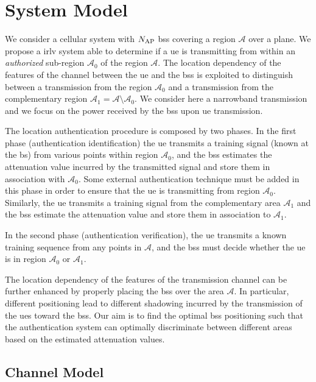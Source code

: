 \documentclass[twocolumns]{IEEEtran}
\begin{document}
\section{System Model}\label{sec:sys model}


We consider a cellular system with $N_{\rm AP}$ \acp{bs} covering a region $\mathcal{A}$ over a plane. We propose a \ac{irlv} system able to determine if a \ac{ue} is transmitting from within an {\em authorized} sub-region $\mathcal{A}_0$ of the region $\mathcal{A}$. The location dependency of the features of the channel between the \ac{ue} and the \acp{bs} is exploited to distinguish between a transmission from the region $\mathcal{A}_0$ and a transmission from the complementary region $\mathcal{A}_1=\mathcal{A} \setminus \mathcal{A}_0$. We consider here a narrowband transmission and we focus on the power received by the \acp{bs} upon \ac{ue} transmission.

The location authentication procedure is composed by two phases. In the first phase (authentication identification) the \ac{ue} transmits a training signal (known at the \acs{bs}) from various points within region $\mathcal{A}_0$, and the \acp{bs} estimates the attenuation value incurred by the transmitted signal and store them in association with $\mathcal{A}_0$. Some external authentication technique must be added in this phase in order to ensure that the \ac{ue} is transmitting from region $\mathcal{A}_0$. Similarly, the \ac{ue} transmits a training signal from the complementary area $\mathcal{A}_1$ and the \acp{bs} estimate the attenuation value and store them in association to $\mathcal{A}_1$.

In the second phase (authentication verification), the \ac{ue} transmits a known training sequence from any points in $\mathcal{A}$, and the \acp{bs} must decide whether the \ac{ue} is in region $\mathcal{A}_0$ or $\mathcal{A}_1$.

The location dependency of the features of the transmission channel can be further enhanced by properly placing the \acp{bs} over the area $\mathcal{A}$. In particular, different positioning lead to different shadowing incurred by the transmission of the \acp{ue} toward the \acp{bs}. Our aim is to find the optimal \acp{bs} positioning such that the authentication system can optimally discriminate between different areas based on the estimated attenuation values.

\subsection{Channel Model}
\end{document}
